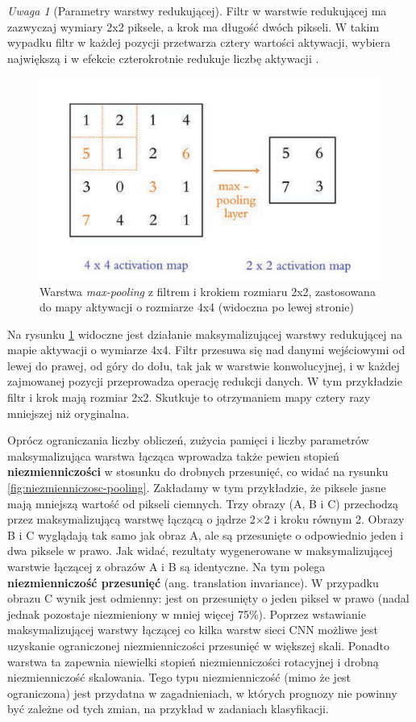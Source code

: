 \documentclass[12pt]{mwbk}
\theoremstyle{plain}
\theoremstyle{definition}
\theoremstyle{remark}
\newtheorem{uwaga}{Uwaga}[chapter]
\newcommand\zrodlo[1]{\par\vspace{-3mm}{\small\textit{Źródło: }#1 }}
\begin{document}
\begin{uwaga}[Parametry warstwy redukującej]
	 Filtr w warstwie redukującej ma zazwyczaj wymiary 2x2 piksele, a krok ma długość dwóch pikseli. W takim wypadku filtr w każdej pozycji przetwarza cztery wartości aktywacji, wybiera największą i w efekcie czterokrotnie redukuje liczbę aktywacji \cite{illustrated}.
\end{uwaga}




\begin{figure}[!h]
	\centering
	\includegraphics[width=0.6\linewidth]{rys/max-polling.png}
	\caption{Warstwa \emph{max-pooling} z filtrem i krokiem rozmiaru 2x2, zastosowana do mapy aktywacji o rozmiarze 4x4 (widoczna po lewej stronie)} %
	\zrodlo{\cite{illustrated}}
	\label{fig:max-polling}
\end{figure}

Na rysunku \ref{fig:max-polling} widoczne jest działanie maksymalizującej warstwy redukującej na mapie aktywacji o wymiarze 4x4. Filtr przesuwa się nad danymi wejściowymi od lewej do prawej, od góry do dołu, tak jak w warstwie konwolucyjnej, i w każdej zajmowanej pozycji przeprowadza operację redukcji danych. W tym przykładzie filtr i krok mają rozmiar 2x2. Skutkuje to otrzymaniem mapy cztery razy mniejszej niż oryginalna.


Oprócz ograniczania liczby obliczeń, zużycia pamięci i liczby parametrów maksymalizująca warstwa łącząca wprowadza także pewien stopień \textbf{niezmienniczości} w stosunku do drobnych przesunięć, co widać na rysunku \ref{fig:niezmienniczosc-pooling}. Zakładamy w tym przykładzie, że piksele jasne mają mniejszą wartość od pikseli
ciemnych. Trzy obrazy (A, B i C) przechodzą przez maksymalizującą warstwę łączącą o jądrze 2×2
i kroku równym 2. Obrazy B i C wyglądają tak samo jak obraz A, ale są przesunięte o odpowiednio jeden i dwa piksele w prawo. Jak widać, rezultaty wygenerowane w maksymalizującej warstwie łączącej z obrazów A i B są identyczne. Na tym polega \textbf{niezmienniczość przesunięć} (ang. translation invariance). W przypadku obrazu C wynik jest odmienny: jest on przesunięty o jeden piksel w prawo (nadal jednak pozostaje niezmieniony w mniej więcej 75\%). Poprzez wstawianie maksymalizującej warstwy łączącej co kilka warstw sieci CNN możliwe jest uzyskanie ograniczonej niezmienniczości przesunięć w większej skali. Ponadto warstwa ta zapewnia niewielki stopień niezmienniczości rotacyjnej i drobną niezmienniczość skalowania. Tego typu niezmienniczość (mimo że jest ograniczona) jest przydatna w zagadnieniach, w których prognozy nie powinny być zależne od tych zmian, na przykład w zadaniach klasyfikacji.
\end{document}
